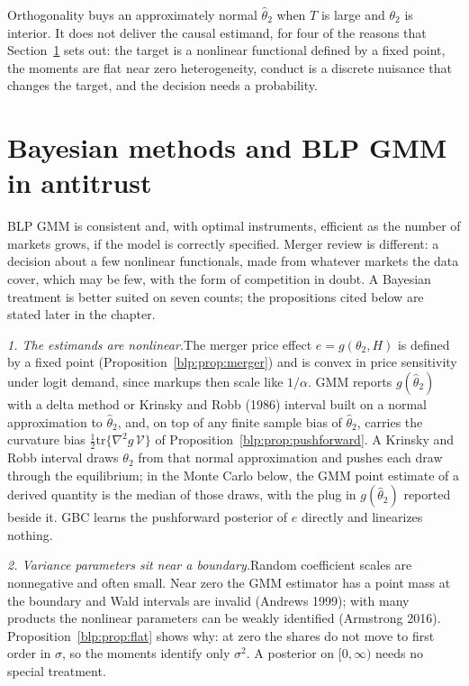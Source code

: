 Orthogonality buys an approximately normal $\hat\theta_2$ when $T$ is large and $\theta_2$ is
interior. It does not deliver the causal estimand, for four of the reasons that Section~\ref{blp:sec:why} sets out: the target is a nonlinear functional defined by a fixed point, the moments are flat near zero heterogeneity, conduct is a discrete nuisance that changes the target, and the decision needs a probability.

\section[Why Bayes for antitrust]{Bayesian methods and BLP GMM in antitrust}\label{blp:sec:why}

BLP GMM is consistent and, with optimal instruments, efficient as the number of markets grows, if the model is correctly specified. Merger review is different: a decision about a few nonlinear functionals, made from whatever markets the data cover, which may be few, with the
form of competition in doubt. A Bayesian treatment is better suited on seven counts; the propositions cited below are stated later in the chapter.

\medskip\noindent\textit{1. The estimands are nonlinear.}\enspace The merger price effect
$e = g(\theta_2,H)$ is defined by a fixed point (Proposition~\ref{blp:prop:merger}) and is convex in
price sensitivity under logit demand, since markups then scale like $1/\alpha$. GMM reports $g(\hat\theta_2)$ with a delta
method or Krinsky and Robb (1986) interval built on a normal approximation to
$\hat\theta_2$, and, on top of any finite sample bias of $\hat\theta_2$, carries the curvature bias $\tfrac12\mathrm{tr}\{\nabla^2 g\,\mathcal V\}$ of
Proposition~\ref{blp:prop:pushforward}. A Krinsky and Robb interval draws $\theta_2$ from that normal approximation and pushes each draw through the equilibrium; in the Monte Carlo below, the GMM point estimate of a derived quantity is the median of those draws, with the plug in $g(\hat\theta_2)$ reported beside it. GBC learns the pushforward posterior of $e$ directly and linearizes nothing.

\medskip\noindent\textit{2. Variance parameters sit near a boundary.}\enspace Random coefficient scales are nonnegative and often small. Near zero the GMM estimator has a point mass
at the boundary and Wald intervals are invalid (Andrews 1999); with many products the
nonlinear parameters can be weakly identified (Armstrong 2016). Proposition~\ref{blp:prop:flat}
shows why: at zero the shares do not move to first order in $\sigma$, so the moments identify only
$\sigma^2$. A posterior on $[0,\infty)$ needs no special treatment. 


